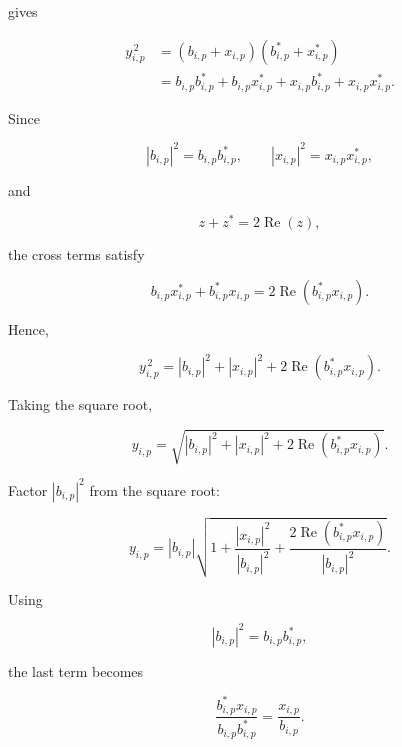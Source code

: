 \documentclass[12pt,a4paper]{article}
\begin{document}
gives

\begin{align}
y_{i,p}^{\,2}
&=
(b_{i,p}+x_{i,p})
(b_{i,p}^*+x_{i,p}^*)
\nonumber\\
&=
b_{i,p}b_{i,p}^*
+
b_{i,p}x_{i,p}^*
+
x_{i,p}b_{i,p}^*
+
x_{i,p}x_{i,p}^*.
\tag{101}
\end{align}

Since

\begin{equation}
|b_{i,p}|^2=b_{i,p}b_{i,p}^*,
\qquad
|x_{i,p}|^2=x_{i,p}x_{i,p}^*,
\tag{102}
\end{equation}

and

\begin{equation}
z+z^*=2\operatorname{Re}(z),
\tag{103}
\end{equation}

the cross terms satisfy

\begin{equation}
b_{i,p}x_{i,p}^*
+
b_{i,p}^*x_{i,p}
=
2\operatorname{Re}
\left(
b_{i,p}^*x_{i,p}
\right).
\tag{104}
\end{equation}

Hence,

\begin{equation}
\boxed{
y_{i,p}^{\,2}
=
|b_{i,p}|^2
+
|x_{i,p}|^2
+
2\operatorname{Re}
\left(
b_{i,p}^*x_{i,p}
\right)
}.
\tag{105}
\end{equation}

Taking the square root,

\begin{equation}
y_{i,p}
=
\sqrt{
|b_{i,p}|^2
+
|x_{i,p}|^2
+
2\operatorname{Re}
\left(
b_{i,p}^*x_{i,p}
\right)
}.
\tag{106}
\end{equation}

Factor $|b_{i,p}|^2$ from the square root:

\begin{equation}
y_{i,p}
=
|b_{i,p}|
\sqrt{
1+
\frac{|x_{i,p}|^2}{|b_{i,p}|^2}
+
\frac{
2\operatorname{Re}(b_{i,p}^*x_{i,p})
}{
|b_{i,p}|^2
}
}.
\tag{107}
\end{equation}

Using

\begin{equation}
|b_{i,p}|^2=b_{i,p}b_{i,p}^*,
\tag{108}
\end{equation}

the last term becomes

\begin{equation}
\frac{
b_{i,p}^*x_{i,p}
}{
b_{i,p}b_{i,p}^*
}
=
\frac{x_{i,p}}{b_{i,p}}.
\tag{109}
\end{equation}
\end{document}

